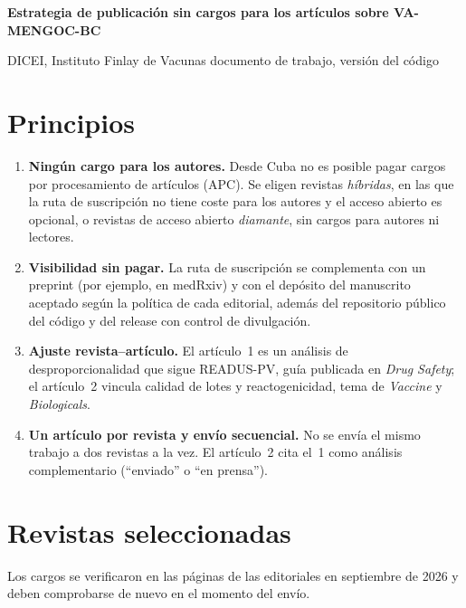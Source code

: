 \documentclass[11pt]{article}
\begin{document}
\begin{center}
{\Large\bfseries Estrategia de publicación sin cargos para los artículos sobre VA-MENGOC-BC\par}
\medskip
{\small DICEI, Instituto Finlay de Vacunas \textperiodcentered{} documento de trabajo, versión del
código \VCodeVersion\par}
\end{center}

\section{Principios}
\begin{enumerate}[leftmargin=*]
\item \textbf{Ningún cargo para los autores.} Desde Cuba no es posible pagar cargos por procesamiento
  de artículos (APC). Se eligen revistas \emph{híbridas}, en las que la ruta de suscripción no tiene
  coste para los autores y el acceso abierto es opcional, o revistas de acceso abierto
  \emph{diamante}, sin cargos para autores ni lectores.
\item \textbf{Visibilidad sin pagar.} La ruta de suscripción se complementa con un preprint (por
  ejemplo, en medRxiv) y con el depósito del manuscrito aceptado según la política de cada editorial,
  además del repositorio público del código y del release con control de divulgación.
\item \textbf{Ajuste revista--artículo.} El artículo~1 es un análisis de desproporcionalidad que
  sigue READUS-PV, guía publicada en \emph{Drug Safety}; el artículo~2 vincula calidad de lotes y
  reactogenicidad, tema de \emph{Vaccine} y \emph{Biologicals}.
\item \textbf{Un artículo por revista y envío secuencial.} No se envía el mismo trabajo a dos revistas
  a la vez. El artículo~2 cita el~1 como análisis complementario (``enviado'' o ``en prensa'').
\end{enumerate}

\section{Revistas seleccionadas}
Los cargos se verificaron en las páginas de las editoriales en septiembre de 2026 y deben
comprobarse de nuevo en el momento del envío.
\end{document}
